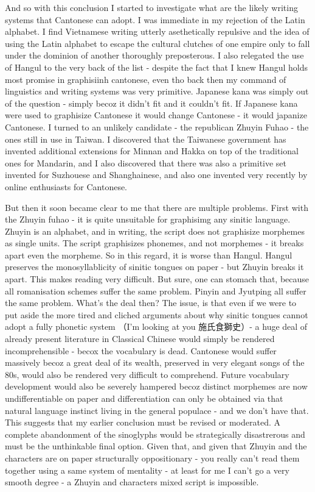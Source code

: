 And so with this conclusion I started to investigate what are the likely writing systems that Cantonese can adopt. I was immediate in my rejection of the Latin alphabet. I find Vietnamese writing utterly asethetically repulsive and the idea of using the Latin alphabet to escape the cultural clutches of one empire only to fall under the dominion of another thoroughly preposterous. I also relegated the use of Hangul to the very back of the list - despite the fact that I knew Hangul holds most promise in graphisiinh cantonese, even tho back then my command of linguistics and writing systems was very primitive. Japanese kana was simply out of the question - simply becoz it didn't fit and it couldn't fit. If Japanese kana were used to graphisize Cantonese it would change Cantonese - it would japanize Cantonese. I turned to an unlikely candidate - the republican Zhuyin Fuhao - the ones still in use in Taiwan. I discovered that the Taiwanese government has invented additional extensions for Minnan and Hakka on top of the traditional ones for Mandarin, and I also discovered that there was also a primitive set invented for Suzhouese and Shanghainese, and also one invented very recently by online enthusiasts for Cantonese.

But then it soon became clear to me that there are multiple problems. First with the Zhuyin fuhao - it is quite unsuitable for graphisimg any sinitic language. Zhuyin is an alphabet, and in writing, the script does not graphisize morphemes as single units. The script graphisizes phonemes, and not morphemes - it breaks apart even the morpheme. So in this regard, it is worse than Hangul. Hangul preserves the monosyllablicity of sinitic tongues on paper - but Zhuyin breaks it apart. This makes reading very difficult. But sure, one can stomach that, because all romanisation schemes suffer the same problem. Pinyin and Jyutping all suffer the same problem. What's the deal then? The issue, is that even if we were to put aside the more tired and cliched arguments about why sinitic tongues cannot adopt a fully phonetic system （I'm looking at you 施氏食獅史）-  a huge deal of already present literature in Classical Chinese would simply be rendered incomprehensible - becox the vocabulary is dead. Cantonese would suffer massively becoz a great deal of its wealth, preserved in very elegant songs of the 80s, would also be rendered very difficult to comprehend. Future vocabulary development would also be severely hampered becoz distinct morphemes are now undifferentiable on paper and differentiation can only be obtained via that natural language instinct living in the general populace - and we don't have that. This suggests that my earlier conclusion must be revised or moderated. A complete abandonment of the sinoglyphs would be strategically disastrerous and must be the unthinkable final option. Given that, and given that Zhuyin and the characters are on paper structurally oppositionary - you really can't read them together using a same system of mentality - at least for me I can't go a very smooth degree - a Zhuyin and characters mixed script is impossible.

